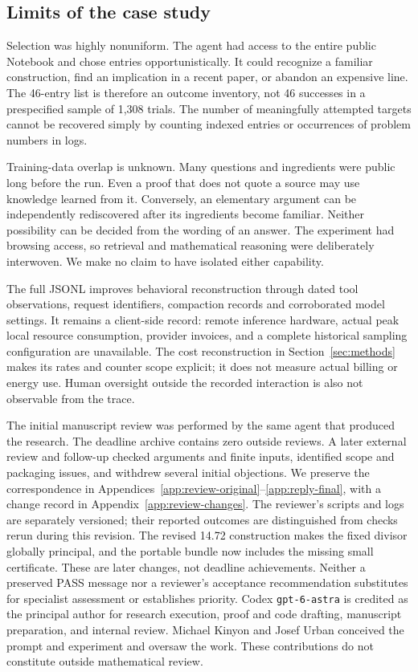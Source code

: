 \subsection{Limits of the case study}

Selection was highly nonuniform. The agent had access to the entire
public Notebook and chose entries opportunistically. It could recognize
a familiar construction, find an implication in a recent paper, or
abandon an expensive line. The 46-entry list is therefore an outcome
inventory, not 46 successes in a prespecified sample of 1,308 trials.
The number of meaningfully attempted targets cannot be recovered simply
by counting indexed entries or occurrences of problem numbers in logs.

Training-data overlap is unknown. Many questions and ingredients were
public long before the run. Even a proof that does not quote a source
may use knowledge learned from it. Conversely, an elementary argument
can be independently rediscovered after its ingredients become familiar.
Neither possibility can be decided from the wording of an answer.
The experiment had browsing access, so retrieval and mathematical
reasoning were deliberately interwoven. We make no claim to have
isolated either capability.

The full JSONL improves behavioral reconstruction through dated tool
observations, request identifiers, compaction records and corroborated
model settings. It remains a client-side record: remote inference
hardware, actual peak local resource consumption, provider invoices,
and a complete historical sampling configuration are unavailable.
The cost reconstruction in Section~\ref{sec:methods} makes its rates
and counter scope explicit; it does not measure actual billing or
energy use. Human oversight outside the recorded interaction is also
not observable from the trace.

The initial manuscript review was performed by the same agent that
produced the research. The deadline archive contains zero outside
reviews. A later external review and follow-up checked arguments and
finite inputs, identified scope and packaging issues, and withdrew
several initial objections. We preserve the correspondence in
Appendices~\ref{app:review-original}--\ref{app:reply-final}, with a
change record in Appendix~\ref{app:review-changes}. The reviewer's
scripts and logs are separately versioned; their reported outcomes
are distinguished from checks rerun during this revision.
The revised 14.72 construction makes the fixed divisor globally
principal, and the portable bundle now includes the missing small
certificate. These are later changes, not deadline achievements.
Neither a preserved PASS message nor a reviewer's acceptance
recommendation substitutes for specialist assessment or establishes
priority. Codex \texttt{gpt-6-astra} is
credited as the principal author for research execution, proof and code
drafting, manuscript preparation, and internal review. Michael Kinyon
and Josef Urban conceived the prompt and experiment and oversaw the
work. These contributions do not constitute outside mathematical review.

